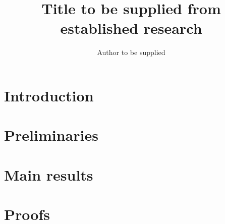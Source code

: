 \documentclass[11pt]{article}
\title{Title to be supplied from established research}
\author{Author to be supplied}
\date{}
\theoremstyle{definition}
\theoremstyle{remark}
\begin{document}
\maketitle
\begin{abstract}
\end{abstract}

\section{Introduction}

\section{Preliminaries}

\section{Main results}

\section{Proofs}



\end{document}

